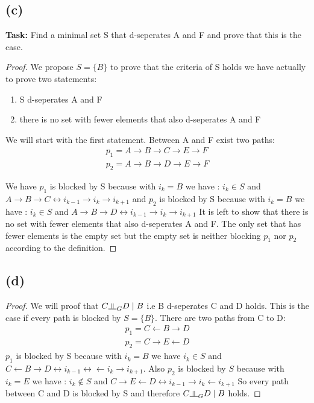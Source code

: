 \documentclass{article}
\newcommand{\dsep}{\rotatebox[origin=c]{90}{$\models$}}
\begin{document}
\subsection*{(c)}
\textbf{Task:} Find a minimal set S that d-seperates A and F and prove that this is the case.
\begin{proof}
    We propose $S= \{ B \}$ to prove that the criteria of S holds we have actually to prove two statements:
    \begin{enumerate}
        \item S d-seperates A and F
        \item there is no set with fewer elements that also d-seperates A and F
    \end{enumerate}
     
We will start with the first statement. Between A and F exist two paths:
\begin{align*}
    p_1 = A \rightarrow B \rightarrow C \rightarrow E \rightarrow F \\
    p_2 = A \rightarrow B \rightarrow D \rightarrow E \rightarrow F 
\end{align*}

We have $p_1$ is blocked by S because with $i_k = B$ we have : $i_k \in S$ and $A \rightarrow B \rightarrow C \leftrightarrow i_{k-1} \rightarrow i_k \rightarrow i_{k+1}$ and $p_2$ is blocked by S because with $i_k = B$ we have : $i_k \in S$ and $A \rightarrow B \rightarrow D \leftrightarrow i_{k-1} \rightarrow i_k \rightarrow i_{k+1}$
It is left to show that there is no set with fewer elements that also d-seperates A and F. The only set that has fewer elements is the empty set but the empty set is neither blocking $p_1$ nor $p_2$ according to the definition.
\end{proof}

\subsection*{(d)}
\begin{proof}
    
    We will proof that $C \dsep_G D \mid B$ i.e B d-seperates C and D holds. 
    This is the case if every path is blocked by $S=\{B\}$. There are two paths from C to D:
    \begin{align*}
        p_1 = C \leftarrow B \rightarrow D \\
        p_2 = C \rightarrow E \leftarrow D
    \end{align*}
    $p_1$ is blocked by S because with $i_k=B$ we have $i_k \in S$ and $C \leftarrow B \rightarrow D \leftrightarrow i_{k-1} \leftrightarrow \leftarrow i_k \rightarrow i_{k+1}$.
    Also $p_2$ is blocked by $S$ because with $i_k=E$ we have : $i_k \notin S$ and $C \rightarrow E \leftarrow D \leftrightarrow i_{k-1} \rightarrow i_k \leftarrow i_{k+1}$
    So every path between C and D is blocked by S and therefore $C \dsep_G D \mid B$ holds.
\end{proof}
\end{document}
